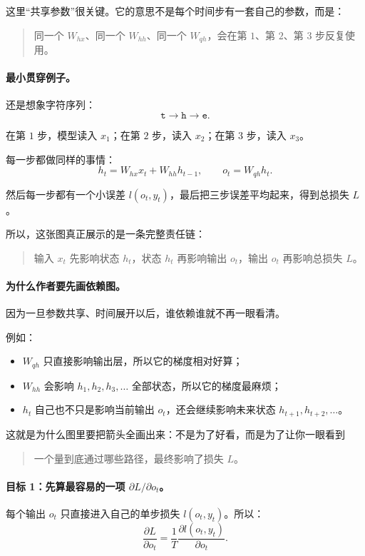 \documentclass[12pt,a4paper]{ctexart}
\begin{document}
这里“共享参数”很关键。它的意思不是每个时间步有一套自己的参数，而是：
\begin{quote}
同一个 \(W_{hx}\)、同一个 \(W_{hh}\)、同一个 \(W_{qh}\)，会在第 \(1\)、第 \(2\)、第 \(3\) 步反复使用。
\end{quote}

\paragraph{最小贯穿例子。}
还是想象字符序列：
\[
\texttt{t} \rightarrow \texttt{h} \rightarrow \texttt{e}.
\]

在第 \(1\) 步，模型读入 \(x_1\)；在第 \(2\) 步，读入 \(x_2\)；在第 \(3\) 步，读入 \(x_3\)。

每一步都做同样的事情：
\[
h_t = W_{hx}x_t + W_{hh}h_{t-1}, \qquad
o_t = W_{qh}h_t.
\]

然后每一步都有一个小误差 \(l(o_t,y_t)\)，最后把三步误差平均起来，得到总损失 \(L\)。

所以，这张图真正展示的是一条完整责任链：
\begin{quote}
输入 \(x_t\) 先影响状态 \(h_t\)，状态 \(h_t\) 再影响输出 \(o_t\)，输出 \(o_t\) 再影响总损失 \(L\)。
\end{quote}

\paragraph{为什么作者要先画依赖图。}
因为一旦参数共享、时间展开以后，谁依赖谁就不再一眼看清。

例如：
\begin{itemize}
  \item \(W_{qh}\) 只直接影响输出层，所以它的梯度相对好算；
  \item \(W_{hh}\) 会影响 \(h_1,h_2,h_3,\ldots\) 全部状态，所以它的梯度最麻烦；
  \item \(h_t\) 自己也不只是影响当前输出 \(o_t\)，还会继续影响未来状态 \(h_{t+1}, h_{t+2}, \ldots\)。
\end{itemize}

这就是为什么图里要把箭头全画出来：不是为了好看，而是为了让你一眼看到
\begin{quote}
一个量到底通过哪些路径，最终影响了损失 \(L\)。
\end{quote}

\paragraph{目标 1：先算最容易的一项 \(\partial L / \partial o_t\)。}
每个输出 \(o_t\) 只直接进入自己的单步损失 \(l(o_t,y_t)\)。所以：
\[
\frac{\partial L}{\partial o_t}
=
\frac{1}{T}\frac{\partial l(o_t,y_t)}{\partial o_t}.
\]
\end{document}

